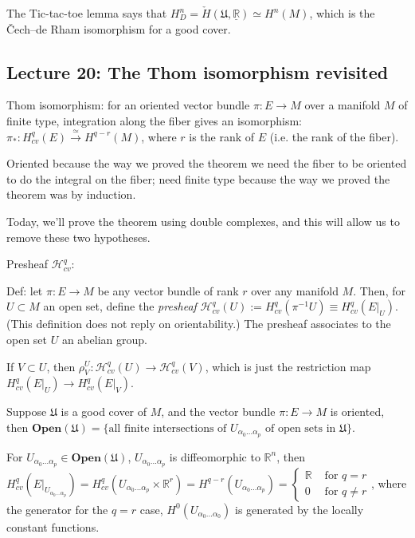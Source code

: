 \documentclass{article}
\theoremstyle{mystyle}
\theoremstyle{remark}
\numberwithin{equation}{section}
\begin{document}
The Tic-tac-toe lemma says that $H^n_D = \check{H}(\mathfrak{U},\underline{\mathbb{R}})
\simeq H^n(M)$, which is the Čech--de Rham isomorphism for a good cover.


\subsection{Lecture 20: The Thom isomorphism revisited}

Thom isomorphism: for an oriented vector bundle $\pi\colon E\rightarrow M$ over a manifold $M$ of finite type, integration along the fiber gives an isomorphism:
$\pi_*\colon H^q_{cv}(E)\xrightarrow{\simeq} H^{q-r}(M)$, where $r$ is the rank of $E$ (i.e. the rank of the fiber).

Oriented because the way we proved the theorem we need the fiber to be oriented to do the integral on the fiber; need finite type because the way we proved the theorem was by induction. 

Today, we'll prove the theorem using double complexes, and this will allow us to remove these two hypotheses.

Presheaf $\mathcal{H}^q_{cv}$:

Def: let $\pi\colon E\rightarrow M$ be any vector bundle of rank $r$ over any manifold $M$. Then, for $U\subset M$ an open set, define the \emph{presheaf} $\mathcal{H}^q_{cv}(U):= H^q_{cv}(\pi^{-1}U) \equiv H^q_{cv}(E|_U)$. (This definition does not reply on orientability.) The presheaf associates to the open set $U$ an abelian group.

If $V\subset U$, then $\rho^U_V\colon \mathcal{H}^q_{cv}(U)\rightarrow \mathcal{H}^q_{cv}(V)$, which is just the restriction map $H^q_{cv}(E|_U)\rightarrow H^q_{cv}(E|_V)$. 


Suppose $\mathfrak{U}$ is a good cover of $M$, and the vector bundle $\pi\colon E\rightarrow M$ is oriented, then $\mathbf{Open}(\mathfrak{U}) = \{\text{all finite intersections of }U_{\alpha_0...\alpha_p} \text{ of open sets in }\mathfrak{U}\}$.

For $U_{\alpha_0...\alpha_p} \in \mathbf{Open}(\mathfrak{U})$, $U_{\alpha_0...\alpha_p}$ is diffeomorphic to $\mathbb{R}^n$, then $H^q_{cv}(E|_{U_{\alpha_0...\alpha_p}}) = H^q_{cv}(U_{\alpha_0...\alpha_p}\times \mathbb{R}^r)
 = H^{q-r}(U_{\alpha_0...\alpha_p}) = \left\{\begin{array}{ll}\mathbb{R}& \text{ for }q=r\\
 0 & \text{ for }q\neq r\end{array}\right.$, where the generator for the $q=r$ case, $H^0(U_{\alpha_0...\alpha_0})$ is generated by the locally constant functions.
\end{document}

